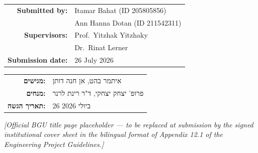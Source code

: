 \begin{titlepage}
\begin{center}
\vfill

\renewcommand{\arraystretch}{1.3}
\begin{tabular}{r l}
\textbf{Submitted by:}      & Itamar Bahat \quad (ID 205805856) \\
                            & Ann Hanna Dotan \quad (ID 211542311) \\
\textbf{Supervisors:}       & Prof.~Yitzhak Yitzhaky \\
                            & Dr.~Rinat Lerner \\
\textbf{Submission date:}   & 26 July 2026 \\
\end{tabular}\par

\vspace{0.8em}
\begin{hebrew}
\begin{tabular}{r l}
\textbf{מגישים:}   & איתמר בהט, אן חנה דותן \\
\textbf{מנחים:}    & פרופ' יצחק יצחקי, ד"ר רינת לרנר \\
\textbf{תאריך הגשה:} & 26 ביולי 2026 \\
\end{tabular}
\end{hebrew}\par

\vfill
{\small\itshape [Official BGU title page placeholder --- to be replaced at
submission by the signed institutional cover sheet in the bilingual format
of Appendix 12.1 of the Engineering Project Guidelines.]}\par

\end{center}
\end{titlepage}
